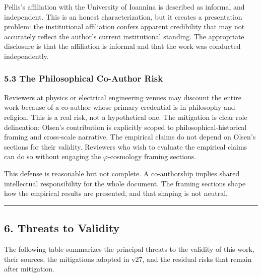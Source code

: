 Pellis's affiliation with the University of Ioannina is described as informal and independent. This is an honest characterization, but it creates a presentation problem: the institutional affiliation confers apparent credibility that may not accurately reflect the author's current institutional standing. The appropriate disclosure is that the affiliation is informal and that the work was conducted independently.

\subsubsection{5.3 The Philosophical Co-Author Risk}

Reviewers at physics or electrical engineering venues may discount the entire work because of a co-author whose primary credential is in philosophy and religion. This is a real risk, not a hypothetical one. The mitigation is clear role delineation: Olsen's contribution is explicitly scoped to philosophical-historical framing and cross-scale narrative. The empirical claims do not depend on Olsen's sections for their validity. Reviewers who wish to evaluate the empirical claims can do so without engaging the $\varphi$-cosmology framing sections.

This defense is reasonable but not complete. A co-authorship implies shared intellectual responsibility for the whole document. The framing sections shape how the empirical results are presented, and that shaping is not neutral.

\noindent\rule{\textwidth}{0.4pt}

\subsection{6. Threats to Validity}

The following table summarizes the principal threats to the validity of this work, their sources, the mitigations adopted in v27, and the residual risks that remain after mitigation.

